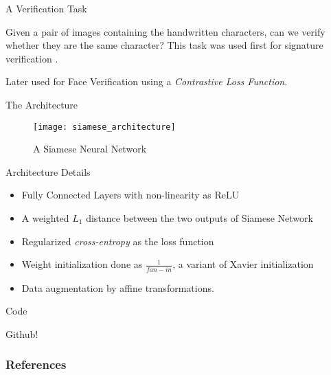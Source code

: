 \documentclass{beamer}
\begin{document}
\begin{frame}{A Verification Task}

Given a pair of images containing the handwritten characters, can we verify whether
they are the same character? This task was used first for signature verification
\cite{Bromley94}.

Later used for Face Verification \cite{Chopra2005} using a \textit{Contrastive
Loss Function}.

\end{frame}

\begin{frame}{The Architecture}

\begin{figure}[H]
\caption{A Siamese Neural Network \cite{Koch2015SiameseNN}}
\texttt{[image: siamese\_architecture]}
\centering
\label{img:siamese_architecture}
\end{figure}

\end{frame}

\begin{frame}{Architecture Details}

\begin{itemize}
\item Fully Connected Layers with non-linearity as ReLU
\item A weighted $L_1$ distance between the two outputs of Siamese Network
\item Regularized \textit{cross-entropy} as the loss function
\item Weight initialization done as $\frac{1}{fan-in}$, a variant of Xavier initialization
\item Data augmentation by affine transformations.
\end{itemize}

\end{frame}

\begin{frame}{Code}

Github!

\end{frame}

\begin{frame}[allowframebreaks]

\nocite{LiFeiFei2006}

\frametitle{References}


\end{frame}
\end{document}
